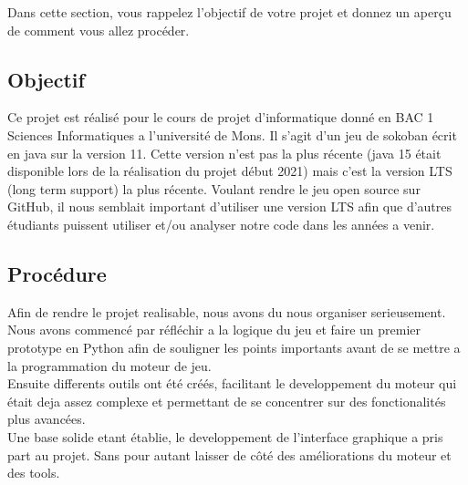 \documentclass[../main.tex]{subfiles}
\begin{document}
Dans cette section, vous rappelez l'objectif de votre projet et donnez un aperçu de comment vous allez procéder.

\subsection{Objectif}
Ce projet est réalisé pour le cours de projet d'informatique donné en BAC 1 Sciences Informatiques a l'université de Mons.
Il s'agit d'un jeu de sokoban écrit en java sur la version 11.
Cette version n'est pas la plus récente (java 15 était disponible lors de la réalisation du projet début 2021) mais c'est la version LTS (long term support) la plus récente.
Voulant rendre le jeu open source sur GitHub, il nous semblait important d'utiliser une version LTS afin que d'autres étudiants puissent utiliser et/ou analyser notre code dans les années a venir.

\subsection{Procédure}
Afin de rendre le projet realisable, nous avons du nous organiser serieusement. \\
Nous avons commencé par réfléchir a la logique du jeu et faire un premier prototype en Python afin de souligner les points importants avant de se mettre a la programmation du moteur de jeu. \\
Ensuite differents outils ont été créés, facilitant le developpement du moteur qui était deja assez complexe et permettant de se concentrer sur des fonctionalités plus avancées. \\
Une base solide etant établie, le developpement de l'interface graphique a pris part au projet. Sans pour autant laisser de côté des améliorations du moteur et des tools.
\end{document}
